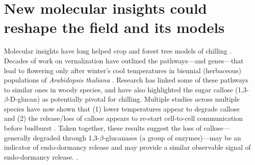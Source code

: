 \documentclass[11pt]{article}
\begin{document}
\section*{New molecular insights could reshape the field and its models} 

Molecular insights have long helped crop and forest tree models of chilling \citep{chuinearees}. Decades of work on vernalization have outlined the pathways---and genes---that lead to flowering only after winter's cool temperatures in biennial (herbaceous) populations of \emph{Arabidopsis thaliana} \citep[Fig. \ref{fig:molecular}][]{Wilczek:2009oa,kim2009vernalization}. Research has linked some of these pathways to similar ones in woody species, and have also highlighted the sugar callose (1,3-$\beta$-{\sc D}-glucan) as potentially pivotal for chilling. Multiple studies across multiple species have now shown that (1) lower temperatures appear to degrade callose and (2) the release/loss of callose appears to re-start cell-to-cell communication before budburst \citep{vanderschoot2014}. Taken together, these results suggest the loss of callose---generally degraded through 1,3-$\beta$-glucanases (a group of enzymes)---may be an indicator of endo-dormancy release \citep[though other factors, such as  ABA, also often change at the same time,][]{tylewicz2018photoperiodic,pan2021aba} and may provide a similar observable signal of endo-dormancy release. \citep{rinne2018,andre2022populus}. 



\end{document}
